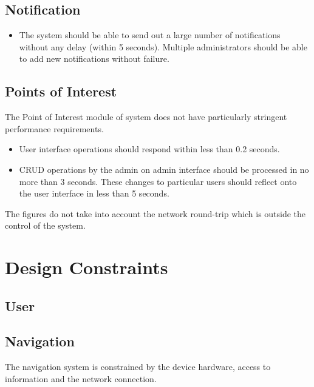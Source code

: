 \documentclass[runningheads,a4paper]{article}
\begin{document}
\subsection{Notification}
\begin{itemize}
\item The system should be able to send out a large number of notifications without any delay (within 5 seconds).
Multiple administrators should be able to add new notifications without failure.
\end{itemize}

\subsection{Points of Interest}
The Point of Interest module of system does not have particularly stringent performance requirements.

\begin{itemize}
\item User interface operations should respond within less than 0.2 seconds.

\item CRUD operations by the admin on admin interface should be processed in no more than 3 seconds. These changes to particular users should reflect onto the user interface in less than 5 seconds.
\end{itemize}

The figures do not take into account the network round-trip which is outside the control of the
system.

\section{Design Constraints}

\subsection{User}
\subsection{Navigation}

The navigation system is constrained by the device hardware, access to information and the network connection.
\end{document}
